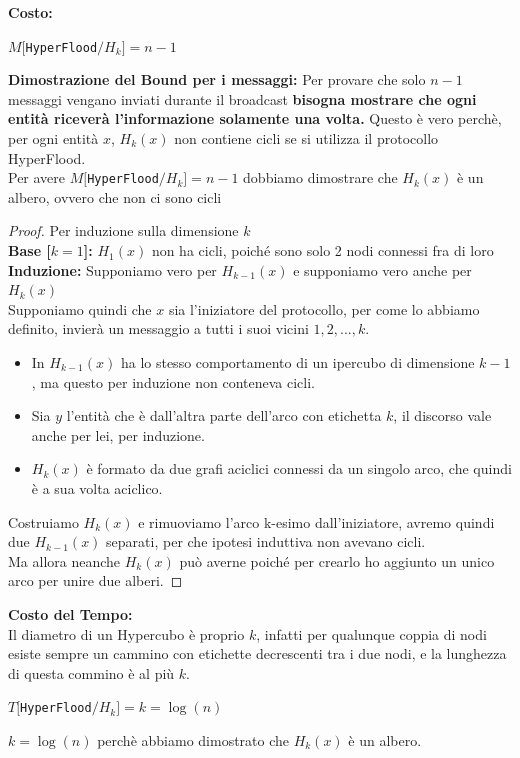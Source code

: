 \textbf{Costo:}
\begin{center}
    $M[$\texttt{HyperFlood}$ / H_k] = n - 1$\\
\end{center}
\textbf{Dimostrazione del Bound per i messaggi:}
Per provare che solo $n-1$ messaggi vengano inviati durante il broadcast \textbf{bisogna mostrare che ogni entità riceverà l'informazione solamente una volta.} Questo è vero perchè, per ogni entità $x$, $H_k(x)$ non contiene cicli se si utilizza il protocollo HyperFlood.\\
Per avere $M[$\texttt{HyperFlood}$ / H_k] = n -1$ dobbiamo dimostrare che $H_k(x)$ è un albero, ovvero che non ci sono cicli
\begin{proof}
Per induzione sulla dimensione $k$\\
\textbf{Base [$k=1$]: }$H_1(x)$ non ha cicli, poiché sono solo 2 nodi connessi fra di loro \\
\textbf{Induzione: } Supponiamo vero per $H_{k-1}(x)$ e supponiamo vero anche per $H_k(x)$ \\
Supponiamo quindi che $x$ sia l'iniziatore del protocollo, per come lo abbiamo definito, invierà un messaggio a tutti i suoi vicini $1, 2, ..., k$.
\begin{itemize}
    \item In $H_{k-1}(x)$ ha lo stesso comportamento di un ipercubo di dimensione $k-1$, ma questo per induzione non conteneva cicli.
    \item Sia $y$ l'entità che è dall'altra parte dell'arco con etichetta $k$, il discorso vale anche per lei, per induzione.
    \item  $H_{k}(x)$ è formato da due grafi aciclici connessi da un singolo arco, che quindi è a sua volta aciclico.
\end{itemize}

Costruiamo $H_k(x)$ e rimuoviamo l'arco k-esimo dall'iniziatore, avremo quindi due $H_{k-1}(x)$ separati, per che ipotesi induttiva non avevano cicli.\\
Ma allora neanche $H_k(x)$ può averne poiché per crearlo ho aggiunto un unico arco per unire due alberi.
\end{proof}

\textbf{Costo del Tempo:}\\
Il diametro di un Hypercubo è proprio $k$, infatti per qualunque coppia di nodi esiste sempre un cammino con etichette decrescenti tra i due nodi, e la lunghezza di questa commino è al più $k$.
\begin{center}
    $T[$\texttt{HyperFlood}$ / H_k] = k = \log(n) $
\end{center}
$k=\log(n)$ perchè abbiamo dimostrato che $H_k(x)$ è un albero.


